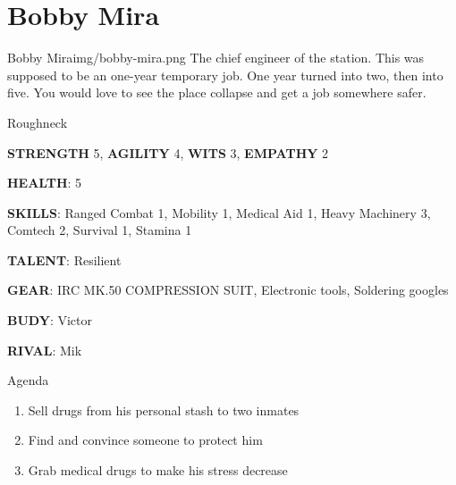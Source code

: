 
\section{Bobby Mira}

\begin{rpg-pcbox}{Bobby Mira}{img/bobby-mira.png}
    The chief engineer of the station. This was supposed to be an one-year temporary job. One year turned into two, then into five. You would love to see the place collapse and get a job somewhere safer.
\end{rpg-pcbox}

\medskip \medskip \medskip \medskip \medskip \medskip \medskip \medskip \medskip 

\begin{rpg-commentbox}{}
    Roughneck

    \textbf{STRENGTH} 5, \textbf{AGILITY} 4, \textbf{WITS} 3, \textbf{EMPATHY} 2

    \textbf{HEALTH}: 5

    \textbf{SKILLS}: Ranged Combat 1, Mobility 1, Medical Aid 1, Heavy Machinery 3, Comtech 2, Survival 1, Stamina 1
    
    \textbf{TALENT}: Resilient
    
    \textbf{GEAR}: IRC MK.50 COMPRESSION SUIT, Electronic tools, Soldering googles

    
    \textbf{BUDY}: Victor
    
    \textbf{RIVAL}: Mik
\end{rpg-commentbox}


\begin{rpg-commentbox}{Agenda}
    \begin{enumerate}[label=\textbf{Act \arabic*}, leftmargin=1cm]
        \item Sell drugs from his personal stash to two inmates
        \item Find and convince someone to protect him
        \item Grab medical drugs to make his stress decrease
    \end{enumerate}
\end{rpg-commentbox}


%

